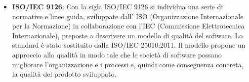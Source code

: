 \begin{itemize}
	\item
	\textbf{ISO/IEC 9126}: Con la sigla ISO/IEC 9126 si individua una serie di normative e linee guida, sviluppate dall’ ISO (Organizzazione Internazionale per la Normazione) in collaborazione con l'IEC (Commissione Elettrotecnica Internazionale), preposte a descrivere un modello di qualità del software. Lo standard è stato sostituito dalla ISO/IEC 25010:2011. Il modello propone un approccio alla qualità in modo tale che le società di software possano migliorare l'organizzazione e i processi e, quindi come conseguenza concreta, la qualità del prodotto sviluppato.
\end{itemize}